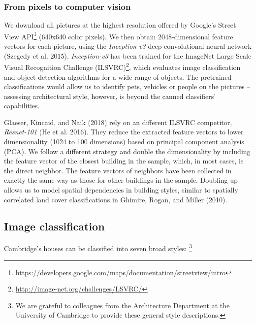 \documentclass[]{article}
\let\rmarkdownfootnote\footnote%
\def\footnote{\protect\rmarkdownfootnote}
\begin{document}
\hypertarget{from-pixels-to-computer-vision}{%
\subsubsection{From pixels to computer
vision}\label{from-pixels-to-computer-vision}}

We download all pictures at the highest resolution offered by Google's
Street View
API\footnote{\href{https://developers.google.com/maps/documentation/streetview/intro}{https://developers.google.com/maps/documentation/streetview/intro}}
(640x640 color pixels). We then obtain 2048-dimensional feature vectors
for each picture, using the \emph{Inception-v3} deep convolutional
neural network (Szegedy et al. 2015). \emph{Inception-v3} has been
trained for the ImageNet Large Scale Visual Recognition Challenge
(ILSVRC)\footnote{\url{http://image-net.org/challenges/LSVRC/}}, which
evaluates image classification and object detection algorithms for a
wide range of objects. The pretrained classifications would allow us to
identify pets, vehicles or people on the pictures -- assessing
architectural style, however, is beyond the canned classifiers'
capabilities.

Glaeser, Kincaid, and Naik (2018) rely on an different ILSVRC
competitor, \emph{Resnet-101} (He et al. 2016). They reduce the
extracted feature vectors to lower dimensionality (1024 to 100
dimensions) based on principal component analysis (PCA). We follow a
different strategy and double the dimensionality by including the
feature vector of the closest building in the sample, which, in most
cases, is the direct neighbor. The feature vectors of neighbors have
been collected in exactly the same way as those for other buildings in
the sample. Doubling up allows us to model spatial dependencies in
building styles, similar to spatially correlated land cover
classifications in Ghimire, Rogan, and Miller (2010).

\hypertarget{image-classification}{%
\subsection{Image classification}\label{image-classification}}

Cambridge's houses can be classified into seven broad styles:
\footnote{We are grateful to colleagues from the Architecture Department at the University of Cambridge to provide these general style descriptions.}
\end{document}
